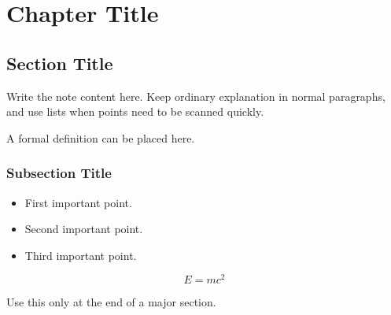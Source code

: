 \documentclass[../main.tex]{subfiles}
\begin{document}
\chapter{Chapter Title}

\section{Section Title}

Write the note content here. Keep ordinary explanation in normal paragraphs,
and use lists when points need to be scanned quickly.

\begin{definitionbox}[Definition]
A formal definition can be placed here.
\end{definitionbox}

\subsection{Subsection Title}

\begin{itemize}
    \item First important point.
    \item Second important point.
    \item Third important point.
\end{itemize}

\begin{formulabox}[Formula]
\[
    E = mc^2
\]
\end{formulabox}

\begin{summarybox}[Summary]
Use this only at the end of a major section.
\end{summarybox}
\end{document}
